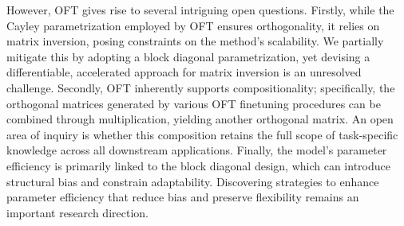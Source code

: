 However, OFT gives rise to several intriguing open questions. Firstly, while the Cayley parametrization employed by OFT ensures orthogonality, it relies on matrix inversion, posing constraints on the method's scalability. We partially mitigate this by adopting a block diagonal parametrization, yet devising a differentiable, accelerated approach for matrix inversion is an unresolved challenge. Secondly, OFT inherently supports compositionality; specifically, the orthogonal matrices generated by various OFT finetuning procedures can be combined through multiplication, yielding another orthogonal matrix. An open area of inquiry is whether this composition retains the full scope of task-specific knowledge across all downstream applications. Finally, the model's parameter efficiency is primarily linked to the block diagonal design, which can introduce structural bias and constrain adaptability. Discovering strategies to enhance parameter efficiency that reduce bias and preserve flexibility remains an important research direction.